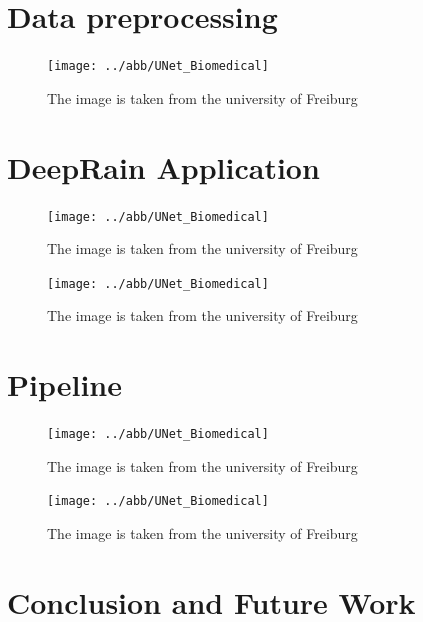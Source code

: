 \documentclass[oneside]{htwg-report}
\begin{document}
\section*{Data preprocessing}

\begin{figure}[ht]
\centering
\texttt{[image: ../abb/UNet\_Biomedical]}
\caption{The image is taken from the university of Freiburg~\cite{ronneberger2015u}}
\end{figure}

\begin{sloppypar}
\noindent
\end{sloppypar}

\section*{DeepRain Application}

\begin{figure}[ht]
    \centering
    \texttt{[image: ../abb/UNet\_Biomedical]}
    \caption{The image is taken from the university of Freiburg~\cite{ronneberger2015u}}
\end{figure}


\begin{figure}[ht]
    \centering
    \texttt{[image: ../abb/UNet\_Biomedical]}
    \caption{The image is taken from the university of Freiburg~\cite{ronneberger2015u}}
\end{figure}



\section*{Pipeline}

\begin{figure}[ht]
    \centering
    \texttt{[image: ../abb/UNet\_Biomedical]}
    \caption{The image is taken from the university of Freiburg~\cite{ronneberger2015u}}
\end{figure}



\begin{figure}[ht]
    \centering
    \texttt{[image: ../abb/UNet\_Biomedical]}
    \caption{The image is taken from the university of Freiburg~\cite{ronneberger2015u}}
\end{figure}

\section*{Conclusion and Future Work}
\end{document}
